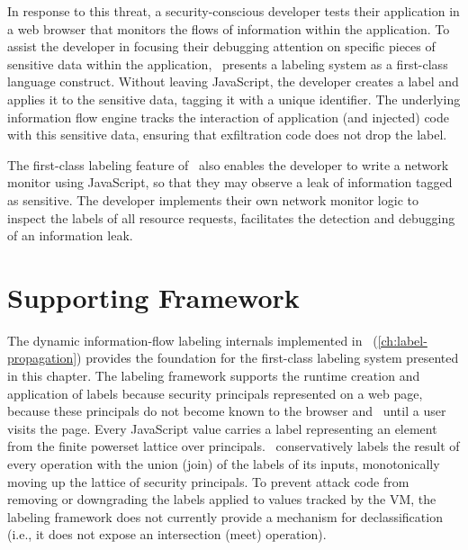 In response to this threat, a security-conscious developer tests their application in a web browser that monitors the flows of information within the application.
To assist the developer in focusing their debugging attention on specific pieces of sensitive data within the application, \FlowCore\ presents a labeling system as a first-class language construct.
Without leaving JavaScript, the developer creates a label and applies it to the sensitive data, tagging it with a unique identifier.
The underlying information flow engine tracks the interaction of application (and injected) code with this sensitive data, ensuring that exfiltration code does not drop the label.

The first-class labeling feature of \FlowCore\ also enables the developer to write a network monitor using JavaScript, so that they may observe a leak of information tagged as sensitive.
The developer implements their own network monitor logic to inspect the labels of all resource requests, facilitates the detection and debugging of an information leak.

\section{Supporting Framework}
\label{sec:supporting-framework}

The dynamic information-flow labeling internals implemented in \FlowCore\ (\autoref{ch:label-propagation}) provides the foundation for the first-class labeling system presented in this chapter.
The labeling framework supports the runtime creation and application of labels because security principals represented on a web page, because these principals do not become known to the browser and \FlowCore\ until a user visits the page.
Every JavaScript value carries a label representing an element from the finite powerset lattice over principals.
\FlowCore\ conservatively labels the result of every operation with the union (join) of the labels of its inputs, monotonically moving up the lattice of security principals.
To prevent attack code from removing or downgrading the labels applied to values tracked by the VM, the labeling framework does not currently provide a mechanism for declassification (i.e., it does not expose an intersection (meet) operation).

